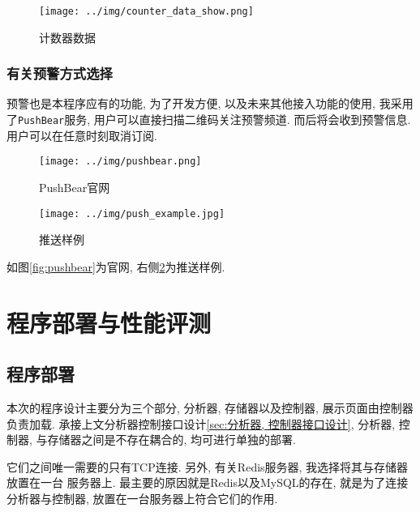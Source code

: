 \begin{figure}[htbp!]
  \centering
  \texttt{[image: ../img/counter\_data\_show.png]}
  \caption{计数器数据}
  \label{fig:counter_data_show}
\end{figure}

\subsection{有关预警方式选择}

  预警也是本程序应有的功能, 为了开发方便, 以及未来其他接入功能的使用,
我采用了\texttt{PushBear}服务, 用户可以直接扫描二维码关注预警频道.
而后将会收到预警信息. 用户可以在任意时刻取消订阅.

\begin{figure}[htbp]

\centering
\begin{minipage}{0.76\textwidth}

    \texttt{[image: ../img/pushbear.png]}
    \caption{PushBear官网}
    \label{fig:pushbear}

\end{minipage} \hfill
\begin{minipage}{0.22\textwidth}

\centering
    \texttt{[image: ../img/push\_example.jpg]}
    \caption{推送样例}
    \label{fig:push_example}
\end{minipage}

\end{figure}

如图\ref{fig:pushbear}为官网, 右侧\ref{fig:push_example}为推送样例.



\chapter{程序部署与性能评测}
\section{程序部署}

  本次的程序设计主要分为三个部分, 分析器, 存储器以及控制器, 展示页面由控制器
负责加载. 承接上文分析器控制接口设计\ref{sec:分析器, 控制器接口设计}, 分析器, 
控制器, 与存储器之间是不存在耦合的, 均可进行单独的部署.

  它们之间唯一需要的只有TCP连接. 另外, 有关Redis服务器, 我选择将其与存储器放置在一台
服务器上. 最主要的原因就是Redis以及MySQL的存在, 就是为了连接分析器与控制器,
放置在一台服务器上符合它们的作用.

